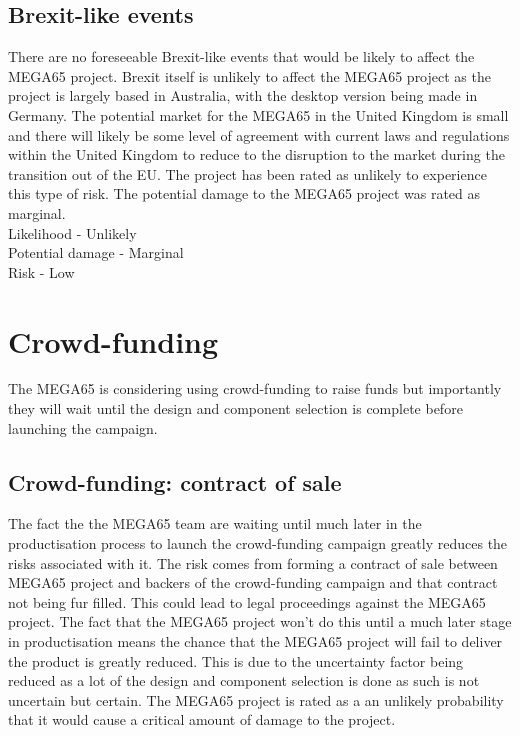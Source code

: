 \subsection{Brexit-like events}
There are no foreseeable Brexit-like events that would be likely to affect the MEGA65 project. Brexit itself is unlikely to affect the MEGA65 project as the project is largely based in Australia, with the desktop version being made in Germany. The potential market for the MEGA65 in the United Kingdom is small and there will likely be some level of agreement with current laws and regulations within the United Kingdom to reduce to the disruption to the market during the transition out of the EU. The project has been rated as unlikely to experience this type of risk. The potential damage to the MEGA65 project was rated as marginal. \\

Likelihood - Unlikely \\
Potential damage - Marginal \\
Risk - Low \\


\section{Crowd-funding}
The MEGA65 is considering using crowd-funding to raise funds but importantly they will wait until the design and component selection is complete before launching the campaign.

\subsection{Crowd-funding: contract of sale}
The fact the the MEGA65 team are waiting until much later in the productisation process to launch the crowd-funding campaign greatly reduces the risks associated with it. The risk comes from forming a contract of sale between MEGA65 project and backers of the crowd-funding campaign and that contract not being fur filled. This could lead to legal proceedings against the MEGA65 project. The fact that the MEGA65 project won't do this until a much later stage in productisation means the chance that the MEGA65 project will fail to deliver the product is greatly reduced. This is due to the uncertainty factor being reduced as a lot of the design and component selection is done as such is not uncertain but certain. The MEGA65 project is rated as a an unlikely probability that it would cause a critical amount of damage to the project. \\

